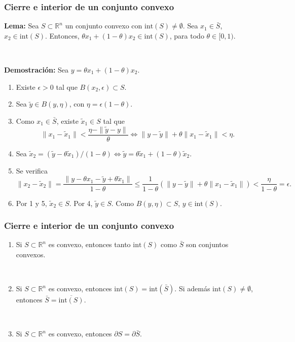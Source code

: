 \documentclass{beamer}
\begin{document}
\begin{frame}
\frametitle{Cierre e interior de un conjunto convexo}


\textbf{Lema:} Sea $S\subset\mathbb{R}^n$ un conjunto convexo con $\mbox{int}(S)\neq\emptyset$. Sea $x_1\in \bar{S}$, $x_2\in\mbox{int}(S)$. Entonces, $\theta x_1+ (1-\theta) x_2 \in\mbox{int}(S)$, para todo $\theta\in [0,1)$.

\

{\scriptsize
\textbf{Demostración:} Sea $y=\theta x_1+ (1-\theta)x_2$.

\begin{enumerate}
\item Existe $\epsilon>0$ tal que $B(x_2,\epsilon)\subset S$.
\item Sea $\tilde{y}\in B(y,\eta)$, con $\eta=\epsilon(1-\theta)$.
\item Como $x_1\in\bar{S}$, existe $\tilde{x}_1\in S$ tal que 
\[
\|x_1-\tilde{x}_1\| < \frac{\eta-\|\tilde{y}-y\|}{\theta}
\Leftrightarrow \|y-\tilde{y}\| + \theta \|x_1 - \tilde{x}_1\| < \eta.
\]
\item Sea $\tilde{x}_2=(\tilde{y} - \theta \tilde{x}_1)/(1-\theta) \Leftrightarrow 
\tilde{y}=\theta \tilde{x}_1 + (1-\theta) \tilde{x}_2$.
\item Se verifica
\[
\|x_2-\tilde{x}_2\| = \frac{\|y-\theta x_1 - \tilde{y}+\theta\tilde{x}_1\|}{1-\theta}\leq  
\frac{1}{1-\theta}(\|y-\tilde{y}\| + \theta \|x_1 - \tilde{x}_1\|)<\frac{\eta}{1-\theta} = \epsilon.
\]
\item Por 1 y 5, $\tilde{x}_2\in S$. Por 4, $\tilde{y}\in S$. Como $B(y,\eta)\subset S$, $y\in \mbox{int}(S)$.



\end{enumerate}
}
\end{frame}
\begin{frame}
\frametitle{Cierre e interior de un conjunto convexo}



\begin{enumerate}

\item Si $S\subset\mathbb{R}^n$ es convexo, entonces tanto $\mbox{int}(S)$ como $\bar{S}$ son conjuntos convexos.

\

\item Si $S\subset\mathbb{R}^n$ es convexo, entonces $\mbox{int}(S)=\mbox{int}(\bar{S})$. Si además $\mbox{int}(S)\neq \emptyset$, entonces $\bar{S}=\overline{\mbox{int}(S)}$.


\

\item Si $S\subset\mathbb{R}^n$ es convexo, entonces $\partial S=\partial \bar{S}$.


\end{enumerate}


\end{frame}
\end{document}
